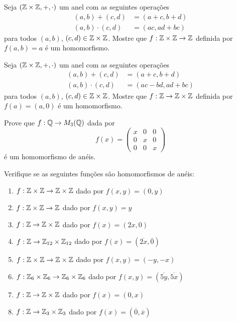 \documentclass[12pt]{exam}
\begin{document}
\vspace{.3cm}

\questao{} Seja $(\mathbb{Z}\times\mathbb{Z}, +, \cdot)$ um anel com as seguintes operações
\begin{align*}
    (a, b) + (c, d) &= (a + c, b + d)\\
    (a, b)\cdot (c, d) &= (ac, ad + bc)
\end{align*}
para todos $(a, b)$, $(c, d) \in \mathbb{Z}\times\mathbb{Z}$.
Mostre que $ f : \mathbb{Z}\times\mathbb{Z} \to \mathbb{Z}$ definida por $f(a, b) = a$ é um homomorfismo.

\vspace{.3cm}

\questao{} Seja $(\mathbb{Z}\times\mathbb{Z}, +, \cdot)$ um anel com as seguintes operações
\begin{align*}
    (a, b) + (c, d) &= (a + c, b + d)\\
    (a, b)\cdot (c, d) &= (ac - bd, ad + bc)
\end{align*}
para todos $(a, b)$, $(c, d) \in \mathbb{Z}\times\mathbb{Z}$.
Mostre que $ f : \mathbb{Z} \to \mathbb{Z}\times\mathbb{Z}$ definida por $f(a) = (a, 0)$ é um homomorfismo.

\vspace{.3cm}

\questao{} Prove que $f : \mathbb{Q} \to M_3(\mathbb{Q})$ dada por
\[
f(x) = \begin{pmatrix}
    x & 0 & 0\\
    0 & x & 0\\
    0 & 0 & x
\end{pmatrix}
\]
é um homomorfismo de anéis.

\newpage

 Verifique se as seguintes funções são homomorfismos de anéis:
\begin{enumerate}[label=({\alph*})]
    \item $f : \mathbb{Z}\times\mathbb{Z} \to \mathbb{Z}\times\mathbb{Z}$ dado por $f(x,y) = (0,y)$

    \item $f : \mathbb{Z}\times\mathbb{Z} \to \mathbb{Z}$ dado por $f(x,y) = y$

    \item $f : \mathbb{Z}\to \mathbb{Z}\times\mathbb{Z}$ dado por $f(x) = (2x,0)$

    \item $f : \mathbb{Z}\to \mathbb{Z}_{12}\times\mathbb{Z}_{12}$ dado por $f(x) = (\overline{2x},\overline{0})$

    \item $f : \mathbb{Z}\times\mathbb{Z} \to \mathbb{Z}\times\mathbb{Z}$ dado por $f(x,y) = (-y,-x)$

    \item $f : \mathbb{Z}_6\times\mathbb{Z}_6 \to \mathbb{Z}_6\times\mathbb{Z}_6$ dado por $f(x,y) = (\overline{5y},\overline{5x})$

    \item $f : \mathbb{Z} \to \mathbb{Z}\times\mathbb{Z}$ dado por $f(x) = (0,x)$

    \item $f : \mathbb{Z} \to \mathbb{Z}_3\times\mathbb{Z}_3$ dado por $f(x) = (\overline{0},\overline{x})$
\end{enumerate}
\end{document}
